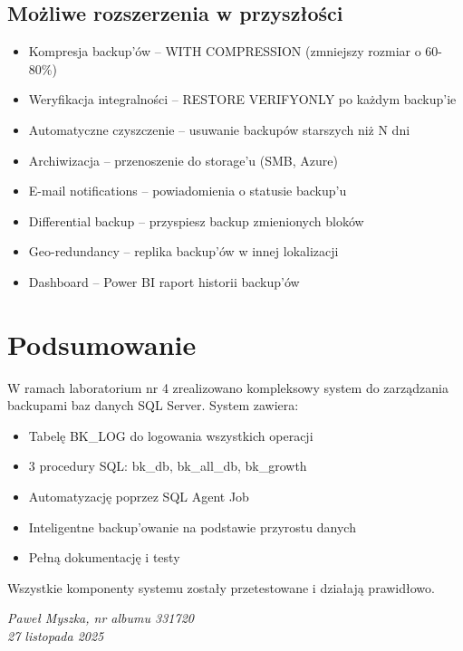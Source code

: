 \documentclass[a4paper,11pt]{article}
\begin{document}
	\subsection{Możliwe rozszerzenia w przyszłości}
	
	\begin{itemize}
		\item Kompresja backup'ów -- WITH COMPRESSION (zmniejszy rozmiar o 60-80\%)
		\item Weryfikacja integralności -- RESTORE VERIFYONLY po każdym backup'ie
		\item Automatyczne czyszczenie -- usuwanie backupów starszych niż N dni
		\item Archiwizacja -- przenoszenie do storage'u (SMB, Azure)
		\item E-mail notifications -- powiadomienia o statusie backup'u
		\item Differential backup -- przyspiesz backup zmienionych bloków
		\item Geo-redundancy -- replika backup'ów w innej lokalizacji
		\item Dashboard -- Power BI raport historii backup'ów
	\end{itemize}
	
	\section{Podsumowanie}
	
	W ramach laboratorium nr 4 zrealizowano kompleksowy system do zarządzania backupami baz danych SQL Server. System zawiera:
	
	\begin{itemize}
		\item Tabelę BK\_LOG do logowania wszystkich operacji
		\item 3 procedury SQL: bk\_db, bk\_all\_db, bk\_growth
		\item Automatyzację poprzez SQL Agent Job
		\item Inteligentne backup'owanie na podstawie przyrostu danych
		\item Pełną dokumentację i testy
	\end{itemize}
	
	Wszystkie komponenty systemu zostały przetestowane i działają prawidłowo.
	
	\vspace{1.5cm}
	
	\begin{center}
		\textit{Paweł Myszka, nr albumu 331720}\\
		\textit{27 listopada 2025}
	\end{center}
	
\end{document}
